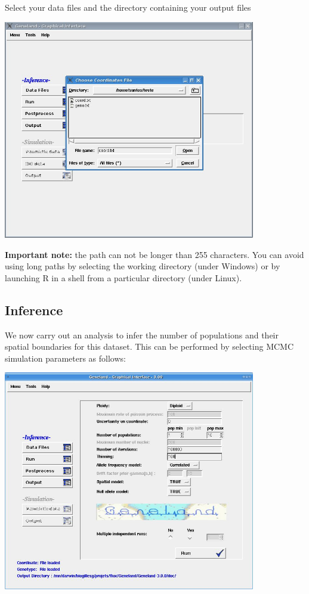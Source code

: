 \documentclass{article}
\begin{document}
\bigskip

Select  your data files and the directory containing your output files\\

\centerline{\includegraphics[width=11cm]{../inst/images/choosefiles.jpg}}


{\bf Important note:} the path can not be longer than 255 characters. 
You can avoid using long paths by selecting the working directory (under Windows) or by launching R in a  shell from 
a particular directory (under Linux). 

\subsection{Inference}

We now carry out an analysis to infer the number of populations and their spatial boundaries for this dataset.
This can be performed by selecting MCMC simulation parameters as follows:\\

\centerline{\includegraphics[width=11cm]{../inst/images/MCMC.jpg}}
\end{document}
